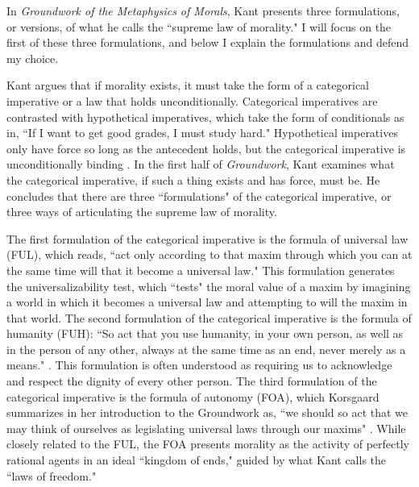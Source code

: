 %
\begin{isabellebody}%
%
%
\isadelimtheory
%
\endisadelimtheory
%
\isatagtheory
%
\endisatagtheory
{\isafoldtheory}%
%
\isadelimtheory
%
\endisadelimtheory
%
\isadelimdocument
%
\endisadelimdocument
%
\isatagdocument
%
\isamarkuptrue%
%
\endisatagdocument
{\isafolddocument}%
%
\isadelimdocument
%
\endisadelimdocument
%
\begin{isamarkuptext}%
In \emph{Groundwork of the Metaphysics of Morals}, Kant presents three formulations, or versions, 
of what he calls the ``supreme law of morality." I will focus on the first of these three formulations, 
and below I explain the formulations and defend my choice.

Kant argues that if  morality 
exists, it must take the form of a categorical imperative or a law that holds unconditionally. Categorical
imperatives are contrasted with hypothetical imperatives, which take the form of conditionals as in, 
``If I want to get good grades, I must study hard." Hypothetical imperatives only have force so long
as the antecedent holds, but the categorical imperative is unconditionally binding \cite[28]{groundwork}. In the first 
half of \emph{Groundwork}, Kant examines what the categorical imperative, if such a thing exists and has force,
must be. He concludes that there are three ``formulations" of the categorical imperative, or three ways 
of articulating the supreme law of morality. 

The first formulation of the categorical imperative is the
formula of universal law (FUL), which reads, ``act only according to that maxim through which you can 
at the same time will that it become a universal law." \cite[34]{groundwork} This formulation
generates the universalizability test, which ``tests" the moral value of a maxim by 
imagining a world in which it becomes a universal law and attempting to will the maxim in that world. The 
second formulation of the categorical imperative is the formula of humanity (FUH): ``So act that you use humanity, 
in your own person, as well as in the person of any other, always at the same time as an end, never merely 
as a means." \cite[41]{groundwork}. This formulation is often understood as requiring us to 
acknowledge and respect the dignity of every other person. The third formulation of the categorical 
imperative is the formula of autonomy (FOA), which Korsgaard summarizes in her introduction to the Groundwork 
as, ``we should so act that we may think of ourselves as legislating universal laws through our 
maxims" \cite[28]{korsgaardintro}. While closely related to the FUL, the FOA presents morality as the activity of 
perfectly rational agents in an ideal ``kingdom of ends," guided by what Kant calls the ``laws of freedom."


\end{isamarkuptext}
\end{isabellebody}

